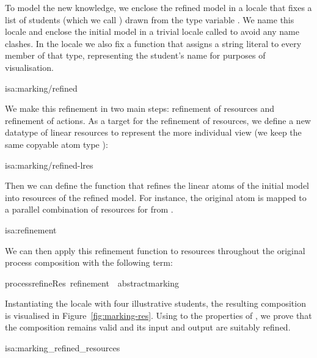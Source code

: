 \documentclass[class=smolathesis,crop=false]{standalone}
\begin{document}
To model the new knowledge, we enclose the refined model in a locale that fixes a list of students (which we call ) drawn from the type variable .
We name this locale  and enclose the initial model in a trivial locale called  to avoid any name clashes.
In the  locale we also fix a function  that assigns a string literal to every member of that type, representing the student's name for purposes of visualisation.
\begin{isadef}{isa:marking/refined}
  
\end{isadef}

We make this refinement in two main steps: refinement of resources and refinement of actions.
As a target for the refinement of resources, we define a new datatype of linear resources to represent the more individual view (we keep the same copyable atom type ):
\pagebreak
\begin{isadef}{isa:marking/refined-lres}
  
\end{isadef}

Then we can define the function that refines the linear atoms of the initial model into resources of the refined model.
For instance, the original atom  is mapped to a parallel combination of  resources for  from .
\begin{isadef}{isa:refinement}
  
\end{isadef}

We can then apply this refinement function to resources throughout the original process composition with the following term:
\begin{isabelle}
\centering
  process{\isacharunderscore}refineRes\ refinement\ \ abstract{\isachardot}marking
\end{isabelle}
Instantiating the locale with four illustrative students, the resulting composition is visualised in Figure~\ref{fig:marking-res}.
Using to the properties of , we prove that the composition remains valid and its input and output are suitably refined.
\begin{isalemma}{isa:marking_refined_resources}
  
\end{isalemma}
\end{document}
